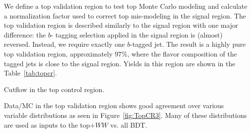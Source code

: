 We define a top validation region to test top Monte Carlo modeling and calculate a normalization factor used to correct top mis-modeling in the signal region. The top validation region is described similarly to the signal region with one major difference: the $b$- tagging selection applied in the signal region is (almost) reversed. Instead, we require exactly one $b$-tagged jet. The result is a highly pure top validation region, approximately $97\%$, where the flavor composition of the tagged jets is close to the signal region. Yields in this region are shown in the Table~\ref{tab:topcr}.

\begin{table}[h!]
\centering
\resizebox{\textwidth}{!}{
}
\caption{Cutflow in the top control region.}
\label{tab:topcr}
\end{table}

Data/MC in the top validation region shows good agreement over various variable distributions as seen in Figure~\ref{fig:TopCR3}. Many of these distributions are used as inputs to the top$+WW$ vs. all BDT. 

